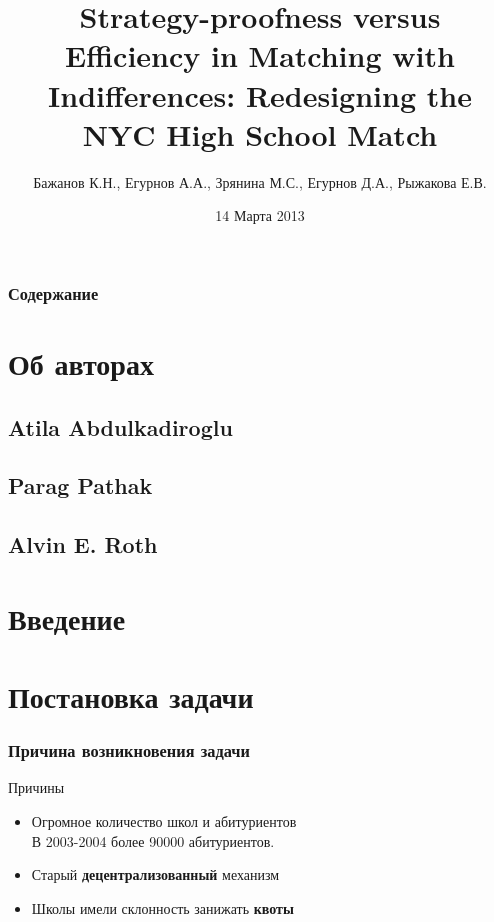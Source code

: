 \documentclass[10pt,pdf,hyperref={unicode}]{beamer}
\title[Strategy-profness versus...]{Strategy-proofness versus Efficiency in Matching with Indifferences: Redesigning the NYC High School Match}
\author[БЕЗЕР]{Бажанов К.Н., Егурнов А.А., Зрянина М.С., Егурнов Д.А., Рыжакова Е.В.}
\institute[НИУ ВШЭ]{Национальный Исследовательский Университет Высшая Школа Экономики}
\date{14 Марта 2013}
\begin{document}
\begin{frame}
    \titlepage
\end{frame}

\begin{frame}
    \frametitle{Содержание}
    \tableofcontents
\end{frame}



\section{Об авторах}

\subsection{Atila Abdulkadiroglu}

\subsection{Parag Pathak}

\subsection{Alvin E. Roth}

\section{Введение}

\section{Постановка задачи}

\begin{frame}
    \frametitle{Причина возникновения задачи}
    \begin{block}{Причины}
        \begin{itemize}
            \item Огромное количество школ и абитуриентов\\В 2003-2004 более 90000 абитуриентов.
            \item Старый {\bf децентрализованный} механизм
            \item Школы имели склонность занижать {\bf квоты}
        \end{itemize}
    \end{block}
\end{frame}
\end{document}
